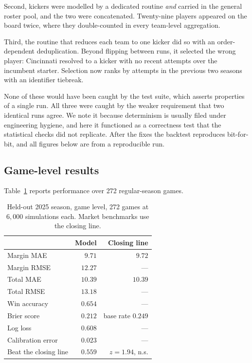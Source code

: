\documentclass[11pt,a4paper]{article}
\begin{document}
Second, kickers were modelled by a dedicated routine \emph{and} carried in the
general roster pool, and the two were concatenated. Twenty-nine players appeared
on the board twice, where they double-counted in every team-level aggregation.

Third, the routine that reduces each team to one kicker did so with an
order-dependent deduplication. Beyond flipping between runs, it selected the
wrong player: Cincinnati resolved to a kicker with no recent attempts over the
incumbent starter. Selection now ranks by attempts in the previous two seasons
with an identifier tiebreak.

None of these would have been caught by the test suite, which asserts properties
of a single run. All three were caught by the weaker requirement that two
identical runs agree. We note it because determinism is usually filed under
engineering hygiene, and here it functioned as a correctness test that the
statistical checks did not replicate. After the fixes the backtest reproduces
bit-for-bit, and all figures below are from a reproducible run.

\subsection{Game-level results}

Table~\ref{tab:game} reports performance over 272 regular-season games.

\begin{table}[t]
\centering
\caption{Held-out 2025 season, game level, 272 games at $6{,}000$ simulations
each. Market benchmarks use the closing line.}
\label{tab:game}
\begin{tabular}{lrr}
\toprule
& Model & Closing line \\
\midrule
Margin MAE            & $9.71$  & $9.72$ \\
Margin RMSE           & $12.27$ & --- \\
Total MAE             & $10.39$ & $10.39$ \\
Total RMSE            & $13.18$ & --- \\
\midrule
Win accuracy          & $0.654$ & --- \\
Brier score           & $0.212$ & base rate $0.249$ \\
Log loss              & $0.608$ & --- \\
Calibration error     & $0.023$ & --- \\
Beat the closing line & $0.559$ & $z = 1.94$, n.s. \\
\bottomrule
\end{tabular}
\end{table}
\end{document}
